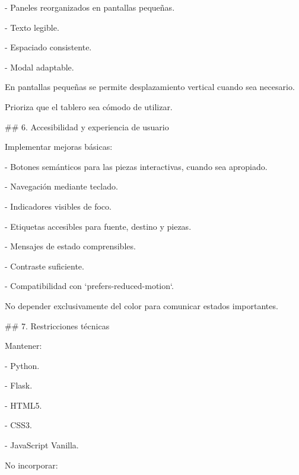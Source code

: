 \noindent - Paneles reorganizados en pantallas pequeñas.\par
\noindent - Texto legible.\par
\noindent - Espaciado consistente.\par
\noindent - Modal adaptable.\par
\par\smallskip
\noindent En pantallas pequeñas se permite desplazamiento vertical cuando sea necesario.\par
\par\smallskip
\noindent Prioriza que el tablero sea cómodo de utilizar.\par
\par\smallskip
\noindent \#\# 6. Accesibilidad y experiencia de usuario\par
\par\smallskip
\noindent Implementar mejoras básicas:\par
\par\smallskip
\noindent - Botones semánticos para las piezas interactivas, cuando sea apropiado.\par
\noindent - Navegación mediante teclado.\par
\noindent - Indicadores visibles de foco.\par
\noindent - Etiquetas accesibles para fuente, destino y piezas.\par
\noindent - Mensajes de estado comprensibles.\par
\noindent - Contraste suficiente.\par
\noindent - Compatibilidad con `prefers-reduced-motion`.\par
\par\smallskip
\noindent No depender exclusivamente del color para comunicar estados importantes.\par
\par\smallskip
\noindent \#\# 7. Restricciones técnicas\par
\par\smallskip
\noindent Mantener:\par
\par\smallskip
\noindent - Python.\par
\noindent - Flask.\par
\noindent - HTML5.\par
\noindent - CSS3.\par
\noindent - JavaScript Vanilla.\par
\par\smallskip
\noindent No incorporar:\par
